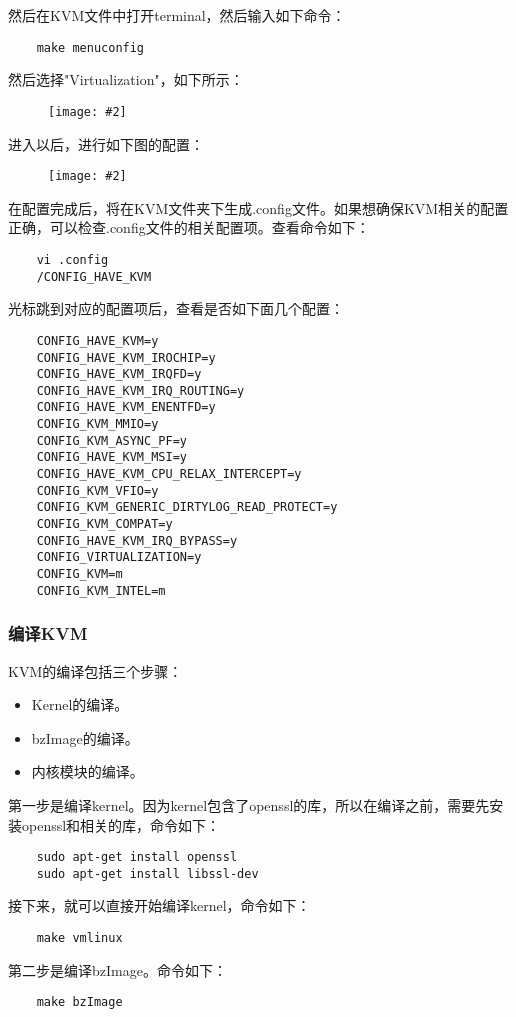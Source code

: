 \documentclass[a4paper,left=2.5cm,right=2.5cm,11pt]{article}
\newcommand{\sizedfic}[2]{\begin{figure}[H]
		\center
		\texttt{[image: \#2]}
	\end{figure}}
\begin{document}
	然后在KVM文件中打开terminal，然后输入如下命令：
	\begin{lstlisting}
	make menuconfig
	\end{lstlisting}

	然后选择"Virtualization"，如下所示：
	\sizedfic{0.7}{4.png}

	进入以后，进行如下图的配置：
	\sizedfic{0.7}{5.png}

	在配置完成后，将在KVM文件夹下生成.config文件。如果想确保KVM相关的配置正确，可以检查.config文件的相关配置项。查看命令如下：
	\begin{lstlisting}
	vi .config
	/CONFIG_HAVE_KVM
	\end{lstlisting}

	光标跳到对应的配置项后，查看是否如下面几个配置：
	\begin{lstlisting}
	CONFIG_HAVE_KVM=y
	CONFIG_HAVE_KVM_IROCHIP=y
	CONFIG_HAVE_KVM_IRQFD=y
	CONFIG_HAVE_KVM_IRQ_ROUTING=y
	CONFIG_HAVE_KVM_ENENTFD=y
	CONFIG_KVM_MMIO=y
	CONFIG_KVM_ASYNC_PF=y
	CONFIG_HAVE_KVM_MSI=y
	CONFIG_HAVE_KVM_CPU_RELAX_INTERCEPT=y
	CONFIG_KVM_VFIO=y
	CONFIG_KVM_GENERIC_DIRTYLOG_READ_PROTECT=y
	CONFIG_KVM_COMPAT=y
	CONFIG_HAVE_KVM_IRQ_BYPASS=y
	CONFIG_VIRTUALIZATION=y
	CONFIG_KVM=m
	CONFIG_KVM_INTEL=m
	\end{lstlisting}

\subsubsection{编译KVM}
	KVM的编译包括三个步骤：
	\begin{itemize}
		\item Kernel的编译。
		\item bzImage的编译。
		\item 内核模块的编译。
	\end{itemize}

	第一步是编译kernel。因为kernel包含了openssl的库，所以在编译之前，需要先安装openssl和相关的库，命令如下：
	\begin{lstlisting}
	sudo apt-get install openssl
	sudo apt-get install libssl-dev
	\end{lstlisting}

	接下来，就可以直接开始编译kernel，命令如下：
	\begin{lstlisting}
	make vmlinux
	\end{lstlisting}

	第二步是编译bzImage。命令如下：
	\begin{lstlisting}
	make bzImage
	\end{lstlisting}
\end{document}
